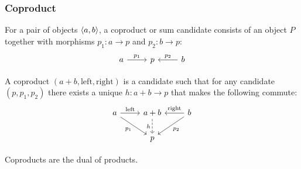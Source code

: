 \subsubsection*{Coproduct}

\begin{definition}

	For a pair of objects $\langle a, b\rangle$, a coproduct or sum candidate consists of an
	object $P$ together with morphisms $p_1: a\to p$ and
	$p_2:b\to p$:
	\[\begin{tikzcd}[ampersand replacement=\&]
		a \& p \& b
		\arrow["{p_1}", from=1-1, to=1-2]
		\arrow["{p_2}"', from=1-3, to=1-2]
	\end{tikzcd}\]

	A coproduct $(a + b, \mathrm{left}, \mathrm{right})$ is a candidate such that
	for any candidate $(p, p_1, p_2)$ there exists a unique $h: a+b\to p$ that
	makes the following commute:
	\parencite{leinster:basic_category_theory}
	\[\begin{tikzcd}[ampersand replacement=\&]
		a \& {a+b} \& b \\
		\& p
		\arrow["{\mathrm{left}}", from=1-1, to=1-2]
		\arrow["{\mathrm{right}}"', from=1-3, to=1-2]
		\arrow["{p_1}"', from=1-1, to=2-2]
		\arrow["{p_2}", from=1-3, to=2-2]
		\arrow["h"', dashed, from=1-2, to=2-2]
	\end{tikzcd}\]
\end{definition}

\begin{remark}
	Coproducts are the dual of products.
\end{remark}

